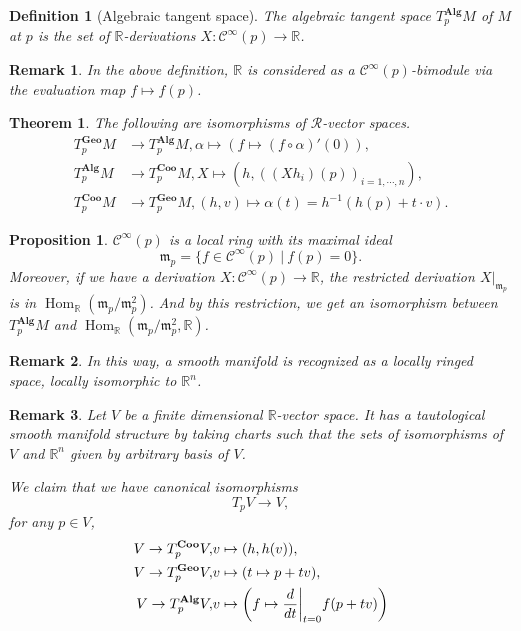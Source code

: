 \documentclass{article}
\newtheorem{theorem}{Theorem}[section]
\newtheorem{proposition}{Proposition}[section]
\newtheorem{definition}{Definition}[section]
\newtheorem{remark}{Remark}[section]
\numberwithin{equation}{section}
\DeclareMathOperator{\Hom}{Hom}
\begin{document}
\begin{definition}[Algebraic tangent space]
The algebraic tangent space $T^{\mathbf{Alg}}_pM$ of $M$ at $p$ is the set of $\mathbb{R}$-derivations $X:\mathcal{C}^\infty(p)\to\mathbb{R}$. 
\end{definition}

\begin{remark}
In the above definition, $\mathbb{R}$ is considered as a $\mathcal{C}^\infty(p)$-bimodule via the evaluation map $f\mapsto f(p)$.
\end{remark}

\begin{theorem}
The following are isomorphisms of $\mathcal{R}$-vector spaces.
\begin{align*}
T^{\mathbf{Geo}}_pM&\to T^{\mathbf{Alg}}_pM, \alpha\mapsto(f\mapsto (f\circ\alpha)'(0)),\\
T^{\mathbf{Alg}}_pM&\to T^{\mathbf{Coo}}_pM, X\mapsto (h, ((Xh_i)(p))_{i=1,\cdots,n}),\\
T^{\mathbf{Coo}}_pM&\to T^{\mathbf{Geo}}_pM, (h,v)\mapsto \alpha(t)=h^{-1}(h(p)+t\cdot v).
\end{align*}
\end{theorem}

\begin{proposition}
$\mathcal{C}^\infty(p)$ is a local ring with its maximal ideal
\begin{equation*}
\mathfrak{m}_p=\{f\in\mathcal{C}^\infty(p)\:|\: f(p) = 0\}.
\end{equation*}
Moreover, if we have a derivation $X:\mathcal{C}^\infty(p)\to\mathbb{R}$, the restricted derivation $X|_{\mathfrak{m}_p}$ is in
$\Hom_{\mathbb{R}}(\mathfrak{m}_p/\mathfrak{m}_p^2)$. 
And by this restriction, we get an isomorphism between $T^{\mathbf{Alg}}_pM$ and $\Hom_{\mathbb{R}}(\mathfrak{m}_p/\mathfrak{m}_p^2,\mathbb{R})$.
\end{proposition} 

\begin{remark}
In this way, a smooth manifold is recognized as a locally ringed space, locally isomorphic to $\mathbb{R}^n$.
\end{remark}

\begin{remark}
Let $V$ be a finite dimensional $\mathbb{R}$-vector space. It has a tautological smooth manifold structure by taking charts such 
that the sets of isomorphisms of $V$ and $\mathbb{R}^n$ given by arbitrary basis of $V$. \\
\par We claim that we have canonical isomorphisms
\begin{equation*}
T_pV\to V,
\end{equation*}
for any $p\in V$,
\begin{align*}
V\to T_p^{\mathbf{Coo}}V,& v\mapsto(h,h(v)),\\
V\to T_p^{\mathbf{Geo}}V,& v\mapsto(t\mapsto p+tv),\\
V\to T_p^{\mathbf{Alg}}V,& v\mapsto\left(f\mapsto{\frac d {dt}}\bigg{|}_{t=0}f(p+tv)\right)
\end{align*}
\end{remark}
\end{document}
